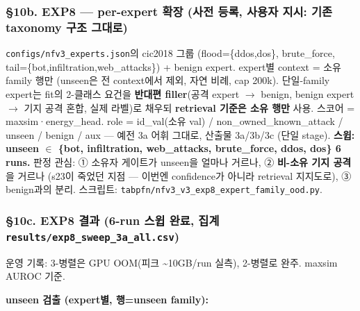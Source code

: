 \subsubsection{§10b. EXP8 — per-expert 확장 (사전 등록, 사용자 지시: 기존 taxonomy 구조 그대로)}
\texttt{configs/\allowbreak{}\allowbreak{}nfv3\_\allowbreak{}\allowbreak{}exp\allowbreak{}erts.\allowbreak{}jso\allowbreak{}n}의 cic2018 그룹 (flood=\allowbreak{}\{ddos,dos\}, brute\_\allowbreak{}force, tail=\allowbreak{}\{bot,infiltration,web\_\allowbreak{}attacks\}) +\allowbreak{} benign expert. expert별 context =\allowbreak{} 소유 family 행만 (unseen은 전 context에서 제외, 자연 비례, cap 200k). 단일-family expert는 fit의 2-클래스 요건을 \textbf{반대편 filler}(공격 expert \ensuremath{\rightarrow} benign, benign expert \ensuremath{\rightarrow} 기지 공격 혼합, 실제 라벨)로 채우되 \textbf{retrieval 기준은 소유 행만} 사용. 스코어 =\allowbreak{} maxsim·energy\_\allowbreak{}head. role =\allowbreak{} id\_\allowbreak{}val(소유 val) /\allowbreak{} non\_\allowbreak{}owned\_\allowbreak{}known\_\allowbreak{}attack /\allowbreak{} unseen /\allowbreak{} benign /\allowbreak{} aux — 예전 3a 어휘 그대로, 산출물 3a/\allowbreak{}3b/\allowbreak{}3c (단일 stage). \textbf{스윕: unseen \ensuremath{\in} \{bot, infiltration, web\_\allowbreak{}attacks, brute\_\allowbreak{}force, ddos, dos\} 6 runs.} 판정 관심: ① 소유자 게이트가 unseen을 얼마나 거르나, ② \textbf{비-소유 기지 공격}을 거르나 (s23이 죽었던 지점 — 이번엔 confidence가 아니라 retrieval 지지도로), ③ benign과의 분리. 스크립트: \texttt{tabpfn/\allowbreak{}\allowbreak{}n\allowbreak{}fv3\_\allowbreak{}\allowbreak{}v3\_\allowbreak{}\allowbreak{}e\allowbreak{}xp8\_\allowbreak{}\allowbreak{}expe\allowbreak{}rt\_\allowbreak{}\allowbreak{}famil\allowbreak{}y\_\allowbreak{}\allowbreak{}ood.\allowbreak{}py\allowbreak{}}.

\subsubsection{§10c. EXP8 결과 (6-run 스윕 완료, 집계 \texttt{results/\allowbreak{}\allowbreak{}exp8\_\allowbreak{}\allowbreak{}swe\allowbreak{}ep\_\allowbreak{}\allowbreak{}3a\_\allowbreak{}\allowbreak{}al\allowbreak{}l.\allowbreak{}csv})}
운영 기록: 3-병렬은 GPU OOM(피크 \textasciitilde{}10GB/\allowbreak{}run 실측), 2-병렬로 완주. maxsim AUROC 기준.

\textbf{unseen 검출 (expert별, 행=\allowbreak{}unseen family):}

